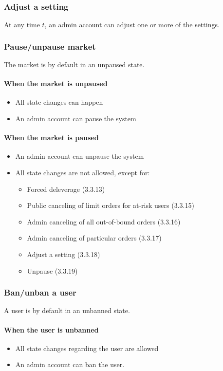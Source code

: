 \documentclass{article}%
\begin{document}
\subsubsection{Adjust a setting}
At any time $t$, an admin account can adjust one or more of the settings.

\subsubsection{Pause/unpause market}
The market is by default in an unpaused state.
\paragraph{When the market is unpaused}
\begin{itemize}
    \item All state changes can happen
    \item An admin account can pause the system
\end{itemize}
\paragraph{When the market is paused}
\begin{itemize}
    \item An admin account can unpause the system
    \item All state changes are not allowed, except for:
    \begin{itemize}
        \item Forced deleverage (3.3.13)
        \item Public canceling of limit orders for at-risk users (3.3.15)
        \item Admin canceling of all out-of-bound orders (3.3.16)
        \item Admin canceling of particular orders (3.3.17)
        \item Adjust a setting (3.3.18)
        \item Unpause (3.3.19)
    \end{itemize}
\end{itemize}

\subsubsection{Ban/unban a user}
A user is by default in an unbanned state.

\paragraph{When the user is unbanned}
\begin{itemize}
    \item All state changes regarding the user are allowed
    \item An admin account can ban the user.
\end{itemize}
\end{document}
